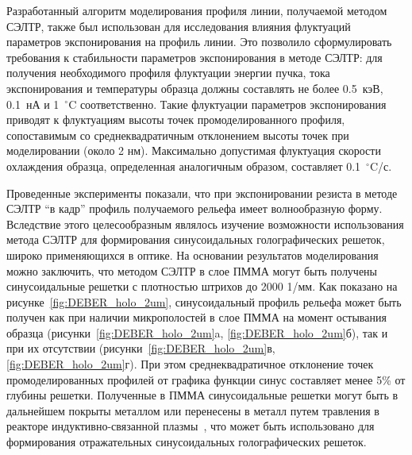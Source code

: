 Разработанный алгоритм моделирования профиля линии, получаемой методом СЭЛТР, также был использован для исследования влияния флуктуаций параметров экспонирования на профиль линии.
Это позволило сформулировать требования к стабильности параметров экспонирования в методе СЭЛТР: для получения необходимого профиля флуктуации энергии пучка, тока экспонирования и температуры образца должны составлять не более 0.5~кэВ, 0.1~нА и 1~$^\circ$C соответственно.
Такие флуктуации параметров экспонирования приводят к флуктуациям высоты точек промоделированного профиля, сопоставимым со среднеквадратичным отклонением высоты точек при моделировании (около 2 нм).
Максимально допустимая флуктуация скорости охлаждения образца, определенная аналогичным образом, составляет 0.1~$^\circ$C/с.

Проведенные эксперименты показали, что при экспонировании резиста в методе СЭЛТР ``в кадр'' профиль получаемого рельефа имеет волнообразную форму.
Вследствие этого целесообразным являлось изучение возможности использования метода СЭЛТР для формирования синусоидальных голографических решеток, широко применяющихся в оптике.
На основании результатов моделирования можно заключить, что методом СЭЛТР в слое ПММА могут быть получены синусоидальные решетки с плотностью штрихов до 2000 1/мм.
Как показано на рисунке~\ref{fig:DEBER_holo_2um}, синусоидальный профиль рельефа может быть получен как при наличии микрополостей в слое ПММА на момент остывания образца (рисунки~\ref{fig:DEBER_holo_2um}a, \ref{fig:DEBER_holo_2um}б), так и при их отсутствии (рисунки~\ref{fig:DEBER_holo_2um}в, \ref{fig:DEBER_holo_2um}г).
При этом среднеквадратичное отклонение точек промоделированных профилей от графика функции синус составляет менее 5\% от глубины решетки.
Полученные в ПММА синусоидальные решетки могут быть в дальнейшем покрыты металлом или перенесены в металл путем травления в реакторе индуктивно-связанной плазмы~\cite{Bruk_2016_mee}, что может быть использовано для формирования отражательных синусоидальных голографических решеток.

